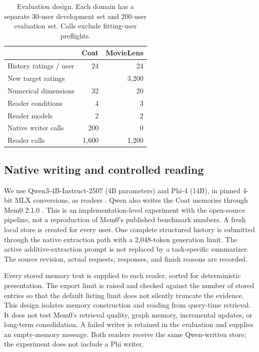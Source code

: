 \documentclass{article}
\begin{document}
\begin{table}[t]
\caption{Evaluation design. Each domain has a separate 30-user development set and 200-user evaluation set. Calls exclude fitting-user preflights.}
\label{tab:design}
\centering\small
\begin{tabular}{lrr}
\toprule
& Coat & MovieLens\\
\midrule
History ratings / user & 24 & 24\\
New target ratings & \CoatTargets{} & 3,200\\
Numerical dimensions & 32 & 20\\
Reader conditions & 4 & 3\\
Reader models & 2 & 2\\
Native writer calls & 200 & 0\\
Reader calls & 1,600 & 1,200\\
\bottomrule
\end{tabular}
\end{table}

\subsection{Native writing and controlled reading}
We use Qwen3-4B-Instruct-2507 (4B parameters) and Phi-4 (14B), in pinned 4-bit MLX conversions, as readers \citep{qwen2025card,phi2024card}. Qwen also writes the Coat memories through Mem0 2.1.0 \citep{chhikara2025mem0}. This is an implementation-level experiment with the open-source pipeline, not a reproduction of Mem0's published benchmark numbers. A fresh local store is created for every user. One complete structured history is submitted through the native extraction path with a 2,048-token generation limit. The active additive-extraction prompt is not replaced by a task-specific summarizer. The source revision, actual requests, responses, and finish reasons are recorded.

Every stored memory text is supplied to each reader, sorted for deterministic presentation. The export limit is raised and checked against the number of stored entries so that the default listing limit does not silently truncate the evidence. This design isolates memory construction and reading from query-time retrieval. It does not test Mem0's retrieval quality, graph memory, incremental updates, or long-term consolidation. A failed writer is retained in the evaluation and supplies an empty-memory message. Both readers receive the same Qwen-written store; the experiment does not include a Phi writer.
\end{document}
